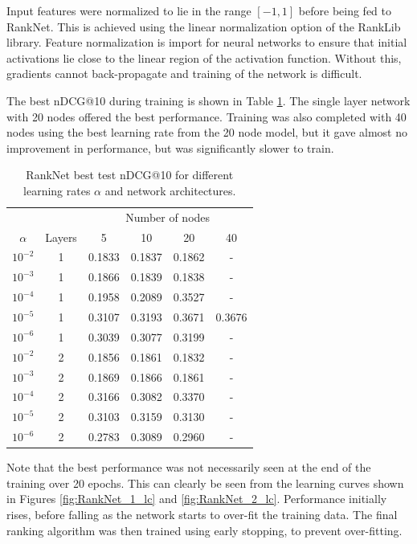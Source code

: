 \documentclass[english]{article}
\theoremstyle{definition}
\begin{document}
\begin{multicols}{2}
Input features were normalized to lie in the range $[-1,1]$ before being fed to RankNet.  This is achieved using the linear normalization option of the RankLib library.  Feature normalization is import for neural networks to ensure that initial activations lie close to the linear region of the activation function.  Without this, gradients cannot back-propagate and training of the network is difficult. 

The best nDCG@10 during training is shown in Table \ref{tab:RankNet_train}.  The single layer network with 20 nodes offered the best performance.  Training was also completed with 40 nodes using the best learning rate from the 20 node model, but it gave almost no improvement in performance, but was significantly slower to train. 

\begin{table}[H]
\begin{center}
\begin{tabular}{c c c c c c}
  \hline
  {} & {} & \multicolumn{4}{c}{Number of nodes}\\
  $\alpha$ & Layers & 5 & 10 & 20 & 40\\
  \hline
  $10^{-2}$ & 1 & 0.1833 & 0.1837 & 0.1862 & - \\
  $10^{-3}$ & 1 & 0.1866 & 0.1839 & 0.1838 & - \\
  $10^{-4}$ & 1 & 0.1958 & 0.2089 & 0.3527 & - \\
  $10^{-5}$ & 1 & 0.3107 & 0.3193 & 0.3671 & 0.3676\\
  $10^{-6}$ & 1 & 0.3039 & 0.3077 & 0.3199 & - \\
  \hline
  $10^{-2}$ & 2 & 0.1856 & 0.1861 & 0.1832 & - \\
  $10^{-3}$ & 2 & 0.1869 & 0.1866 & 0.1861 & - \\
  $10^{-4}$ & 2 & 0.3166 & 0.3082 & 0.3370 & - \\
  $10^{-5}$ & 2 & 0.3103 & 0.3159 & 0.3130 & - \\
  $10^{-6}$ & 2 & 0.2783 & 0.3089 & 0.2960 & - \\
  \hline
\end{tabular}
\caption{\label{tab:RankNet_train}RankNet best test nDCG@10 for different learning rates $\alpha$ and network architectures.}
\end{center}
\end{table}

Note that the best performance was not necessarily seen at the end of the training over 20 epochs.  This can clearly be seen from the learning curves shown in Figures \ref{fig:RankNet_1_lc} and \ref{fig:RankNet_2_lc}.  Performance initially rises, before falling as the network starts to over-fit the training data.  The final ranking algorithm was then trained using early stopping, to prevent over-fitting.  


\end{multicols}
\end{document}
